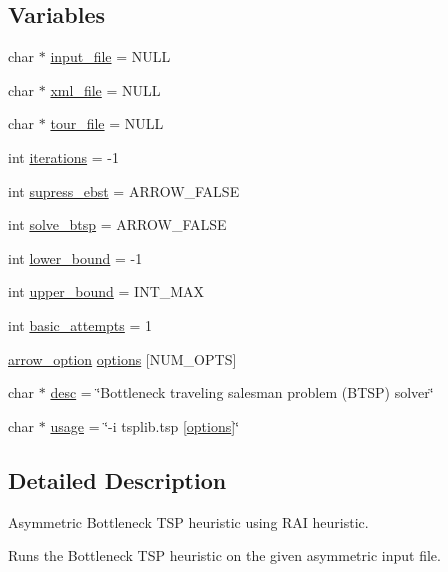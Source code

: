 \subsection*{Variables}
\begin{CompactItemize}
\item 
char $\ast$ \hyperlink{abtsp-rai_8c_a4f3a15de34c409bdec6ceacf93078ed}{input\_\-file} = NULL
\item 
char $\ast$ \hyperlink{abtsp-rai_8c_bf4e392494984c6ef8259268eb1fe421}{xml\_\-file} = NULL
\item 
char $\ast$ \hyperlink{abtsp-rai_8c_b818a82f867be75d7c4d92d792b0943e}{tour\_\-file} = NULL
\item 
int \hyperlink{abtsp-rai_8c_1d10e252e778731e59f0f71afd7e727e}{iterations} = -1
\item 
int \hyperlink{abtsp-rai_8c_502a0aac74d070b870b1c096d9d8520d}{supress\_\-ebst} = ARROW\_\-FALSE
\item 
int \hyperlink{abtsp-rai_8c_de7f7731dd87b73e02ed30fd099d5cc5}{solve\_\-btsp} = ARROW\_\-FALSE
\item 
int \hyperlink{abtsp-rai_8c_ed7394fd8e0c2796b26b9654fd10fd9d}{lower\_\-bound} = -1
\item 
int \hyperlink{abtsp-rai_8c_f5a34eb1d01ffd792adcadc9627ffcb8}{upper\_\-bound} = INT\_\-MAX
\item 
int \hyperlink{abtsp-rai_8c_227b7ec968925f365b96a92ace419c56}{basic\_\-attempts} = 1
\item 
\hyperlink{structarrow__option}{arrow\_\-option} \hyperlink{abtsp-rai_8c_cea6a9709d519c143f30db401a0d0c72}{options} \mbox{[}NUM\_\-OPTS\mbox{]}
\item 
char $\ast$ \hyperlink{abtsp-rai_8c_3aad16fd4bea1b9717f232ea75ad6449}{desc} = \char`\"{}Bottleneck traveling salesman problem (BTSP) solver\char`\"{}
\item 
char $\ast$ \hyperlink{abtsp-rai_8c_adebe2487a2c5240ab6cd02c83add0bf}{usage} = \char`\"{}-i tsplib.tsp \mbox{[}\hyperlink{tourinfo_8c_cea6a9709d519c143f30db401a0d0c72}{options}\mbox{]}\char`\"{}
\end{CompactItemize}


\subsection{Detailed Description}
Asymmetric Bottleneck TSP heuristic using RAI heuristic. 

Runs the Bottleneck TSP heuristic on the given asymmetric input file.

